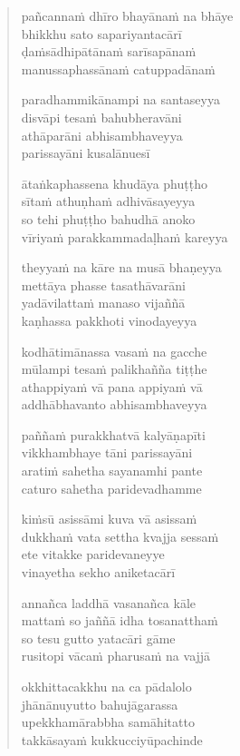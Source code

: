 \begin{verse}
pañcannaṁ dhīro bhayānaṁ na bhāye\\
bhikkhu sato sapariyantacārī\\
ḍaṁsādhipātānaṁ sarīsapānaṁ\\
manussaphassānaṁ catuppadānaṁ

paradhammikānampi na santaseyya\\
disvāpi tesaṁ bahubheravāni\\
athāparāni abhisambhaveyya\\
parissayāni kusalānuesī

ātaṅkaphassena khudāya phuṭṭho\\
sītaṁ athuṇhaṁ adhivāsayeyya\\
so tehi phuṭṭho bahudhā anoko\\
vīriyaṁ parakkammadaḷhaṁ kareyya

theyyaṁ na kāre na musā bhaṇeyya\\
mettāya phasse tasathāvarāni\\
yadāvilattaṁ manaso vijaññā\\
kaṇhassa pakkhoti vinodayeyya

kodhātimānassa vasaṁ na gacche\\
mūlampi tesaṁ palikhañña tiṭṭhe\\
athappiyaṁ vā pana appiyaṁ vā\\
addhābhavanto abhisambhaveyya

paññaṁ purakkhatvā kalyāṇapīti\\
vikkhambhaye tāni parissayāni\\
aratiṁ sahetha sayanamhi pante\\
caturo sahetha paridevadhamme

kiṁsū asissāmi kuva vā asissaṁ\\
dukkhaṁ vata settha kvajja sessaṁ\\
ete vitakke paridevaneyye\\
vinayetha sekho aniketacārī

annañca laddhā vasanañca kāle\\
mattaṁ so jaññā idha tosanatthaṁ\\
so tesu gutto yatacāri gāme\\
rusitopi vācaṁ pharusaṁ na vajjā

okkhittacakkhu na ca pādalolo\\
jhānānuyutto bahujāgarassa\\
upekkhamārabbha samāhitatto\\
takkāsayaṁ kukkucciyūpachinde


\end{verse}
